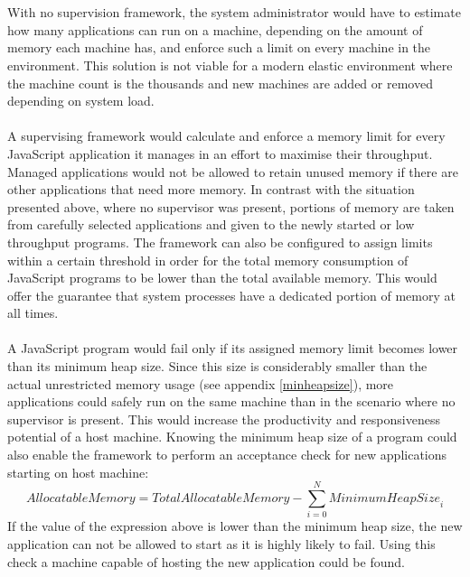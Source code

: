 \documentclass{l4proj}
\begin{document}
\\\\
\hspace*{3em} With no supervision framework, the system administrator would have to estimate how many applications can run on a machine, depending on the amount of memory each machine has, and enforce such a limit on every machine in the environment. This solution is not viable for a modern elastic environment where the machine count is the thousands and new machines are added or removed depending on system load. 
\\\\
\hspace*{3em} A supervising framework would calculate and enforce a memory limit for every JavaScript application it manages in an effort to maximise their throughput. Managed applications would not be allowed to retain unused memory if there are other applications that need more memory. In contrast with the situation presented above, where no supervisor was present, portions of memory are taken from carefully selected applications and given to the newly started or low throughput programs. The framework can also be configured to assign limits within a certain threshold in order for the total memory consumption of JavaScript programs to be lower than the total available memory. This would offer the guarantee that system processes have a dedicated portion of memory at all times.
\\\\
\hspace*{3em} A JavaScript program would fail only if its assigned memory limit becomes lower than its minimum heap size. Since this size is considerably smaller than the actual unrestricted memory usage (see appendix \cref{minheapsize}), more applications could safely run on the same machine than in the scenario where no supervisor is present. This would increase the productivity and responsiveness potential of a host machine. Knowing the minimum heap size of a program could also enable the framework to perform an acceptance check for new applications starting on host machine:
\begin{equation} 
\textit{AllocatableMemory} = \textit{TotalAllocatableMemory} - \sum_{i=0}^{N}\textit{MinimumHeapSize}_i
\end{equation}
If the value of the expression above is lower than the minimum heap size, the new application can not be allowed to start as it is highly likely to fail. Using this check a machine capable of hosting the new application could be found.
\end{document}
